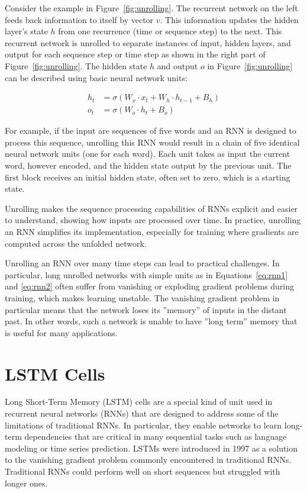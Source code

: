 Consider the example in Figure~\ref{fig:unrolling}. The recurrent network on the left feeds back information to itself by vector $v$. This information updates the hidden layer's state $h$ from one recurrence (time or sequence step) to the next. This recurrent network is unrolled to separate instances of input, hidden layers, and output for each sequence step or time step as shown in the right part of Figure~\ref{fig:unrolling}. The hidden state $h$ and output $o$ in Figure~\ref{fig:unrolling} can be described using basic neural network units:

\begin{align}
h_t &= \sigma ( W_{x} \cdot x_t + W_{h} \cdot h_{t-1} + B_{h}) \label{eq:rnn1} \\
o_t &= \sigma (W_{o} \cdot h_t + B_{o} ) \label{eq:rnn2} 
\end{align}

For example, if the input are sequences of five words and an RNN is designed to process this sequence, unrolling this RNN would result in a chain of five identical neural network units (one for each word). Each unit takes as input the current word, however encoded, and the hidden state output by the previous unit. The first block receives an initial hidden state, often set to zero, which is a starting state.

Unrolling makes the sequence processing capabilities of RNNs explicit and easier to understand, showing how inputs are processed over time. In practice, unrolling an RNN simplifies its implementation, especially for training where gradients are computed across the unfolded network. 

Unrolling an RNN over many time steps can lead to practical challenges. In particular, long unrolled networks with simple units as in Equations~\ref{eq:rnn1} and \ref{eq:rnn2} often suffer from vanishing or exploding gradient problems during training, which makes learning unstable. The vanishing gradient problem in particular means that the network loses its ''memory'' of inputs in the distant past. In other words, such a network is unable to have ''long term'' memory that is useful for many applications.

\section{LSTM Cells}

Long Short-Term Memory (LSTM) cells are a special kind of unit used in recurrent neural networks (RNNs) that are designed to address some of the limitations of traditional RNNs. In particular, they enable networks to learn long-term dependencies that are critical in many sequential tasks such as language modeling or time series prediction. LSTMs were introduced in 1997 as a solution to the vanishing gradient problem commonly encountered in traditional RNNs. Traditional RNNs could perform well on short sequences but struggled with longer ones.

